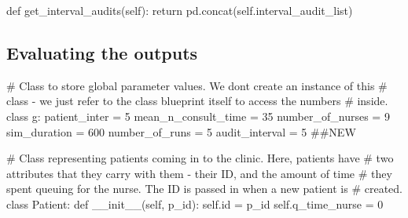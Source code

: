 \documentclass[
  letterpaper,
  DIV=11,
  numbers=noendperiod]{scrreprt}
\newenvironment{Shaded}{\begin{snugshade}}{\end{snugshade}}
\newcommand{\BuiltInTok}[1]{\textcolor[rgb]{0.00,0.23,0.31}{#1}}
\newcommand{\CommentTok}[1]{\textcolor[rgb]{0.37,0.37,0.37}{#1}}
\newcommand{\ControlFlowTok}[1]{\textcolor[rgb]{0.00,0.23,0.31}{#1}}
\newcommand{\DecValTok}[1]{\textcolor[rgb]{0.68,0.00,0.00}{#1}}
\newcommand{\FunctionTok}[1]{\textcolor[rgb]{0.28,0.35,0.67}{#1}}
\newcommand{\KeywordTok}[1]{\textcolor[rgb]{0.00,0.23,0.31}{#1}}
\newcommand{\NormalTok}[1]{\textcolor[rgb]{0.00,0.23,0.31}{#1}}
\newcommand{\OperatorTok}[1]{\textcolor[rgb]{0.37,0.37,0.37}{#1}}
\newcommand{\VariableTok}[1]{\textcolor[rgb]{0.07,0.07,0.07}{#1}}
\begin{document}
\begin{Shaded}
\begin{Highlighting}[]
\KeywordTok{def}\NormalTok{ get\_interval\_audits(}\VariableTok{self}\NormalTok{):}
  \ControlFlowTok{return}\NormalTok{ pd.concat(}\VariableTok{self}\NormalTok{.interval\_audit\_list)}
\end{Highlighting}
\end{Shaded}

\subsection{Evaluating the outputs}\label{evaluating-the-outputs-7}

\begin{tcolorbox}[enhanced jigsaw, rightrule=.15mm, colback=white, colframe=quarto-callout-note-color-frame, colbacktitle=quarto-callout-note-color!10!white, toprule=.15mm, coltitle=black, opacityback=0, titlerule=0mm, bottomtitle=1mm, breakable, title=\textcolor{quarto-callout-note-color}{\faInfo}\hspace{0.5em}{Click here to view the full code}, opacitybacktitle=0.6, toptitle=1mm, arc=.35mm, bottomrule=.15mm, leftrule=.75mm, left=2mm]

\begin{Shaded}
\begin{Highlighting}[]
\CommentTok{\# Class to store global parameter values.  We don\textquotesingle{}t create an instance of this}
\CommentTok{\# class {-} we just refer to the class blueprint itself to access the numbers}
\CommentTok{\# inside.}
\KeywordTok{class}\NormalTok{ g:}
\NormalTok{    patient\_inter }\OperatorTok{=} \DecValTok{5}
\NormalTok{    mean\_n\_consult\_time }\OperatorTok{=} \DecValTok{35}
\NormalTok{    number\_of\_nurses }\OperatorTok{=} \DecValTok{9}
\NormalTok{    sim\_duration }\OperatorTok{=} \DecValTok{600}
\NormalTok{    number\_of\_runs }\OperatorTok{=} \DecValTok{5}
\NormalTok{    audit\_interval }\OperatorTok{=} \DecValTok{5} \CommentTok{\#\#NEW}

\CommentTok{\# Class representing patients coming in to the clinic.  Here, patients have}
\CommentTok{\# two attributes that they carry with them {-} their ID, and the amount of time}
\CommentTok{\# they spent queuing for the nurse.  The ID is passed in when a new patient is}
\CommentTok{\# created.}
\KeywordTok{class}\NormalTok{ Patient:}
    \KeywordTok{def} \FunctionTok{\_\_init\_\_}\NormalTok{(}\VariableTok{self}\NormalTok{, p\_id):}
        \VariableTok{self}\NormalTok{.}\BuiltInTok{id} \OperatorTok{=}\NormalTok{ p\_id}
        \VariableTok{self}\NormalTok{.q\_time\_nurse }\OperatorTok{=} \DecValTok{0}


\end{Highlighting}
\end{Shaded}
\end{tcolorbox}
\end{document}
